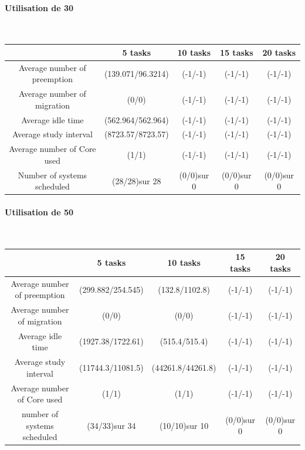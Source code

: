 \documentclass[a4paper,10pt]{article}
\begin{document}
\leftskip -2cm
{
	  	\paragraph*{Utilisation de 30}~\\
	  	\begin{tabular}{|c|c|c|c|c|} \hline
	  	 &	 	 5 tasks 	 &  10 tasks 	  &   15 tasks 	 &   20 tasks 	\\ \hline
Average number of preemption & 	 	(139.071/96.3214)& 	(-1/-1)	 & 	(-1/-1)	 & 	(-1/-1) \\ \hline
Average number of migration & 		(0/0)	 	 & 	(-1/-1)	 & 	(-1/-1)	 & 	(-1/-1) \\ \hline
Average idle time  & 			(562.964/562.964)& 	(-1/-1)	 & 	(-1/-1)	 & 	(-1/-1) \\ \hline
Average study interval  & 		(8723.57/8723.57)& 	(-1/-1)	 & 	(-1/-1)	 & 	(-1/-1) \\ \hline
Average number of Core used &  	 	(1/1)	 	 & 	(-1/-1)	& 	(-1/-1)	 & 	(-1/-1) \\ \hline
Number of systems scheduled &  	 	(28/28)sur 28	 & 	(0/0)sur 0& 	(0/0)sur 0& 	(0/0)sur 0 \\ \hline
\end{tabular}

\paragraph*{Utilisation de 50}~\\
	  	\begin{tabular}{|c|c|c|c|c|} \hline
	  	 &	 	 5 tasks 	 &  10 tasks 	  &   15 tasks 	 &   20 tasks 	\\ \hline
Average number of preemption  & 	 	(299.882/254.545) & 	(132.8/1102.8)	  & 	(-1/-1)	  & 	(-1/-1)\\ \hline
Average number of migration  & 		(0/0)	 	  & 	(0/0)	          & 	(-1/-1)	  & 	(-1/-1)\\ \hline
Average idle time   & 			(1927.38/1722.61) & 	(515.4/515.4)     & 	(-1/-1)	 & 	(-1/-1)\\ \hline
Average study interval   & 		(11744.3/11081.5) & 	(44261.8/44261.8) & 	(-1/-1)	  &	(-1/-1)\\ \hline
Average number of Core used  &  	 	(1/1)	 	  & 	(1/1)	      	  & 	(-1/-1)	  & 	(-1/-1)\\ \hline
number of systems scheduled  &  	 	(34/33)sur 34	  & 	(10/10)sur 10  	  & 	(0/0)sur 0 & 	(0/0)sur 0\\ \hline
\end{tabular}
}
\end{document}
